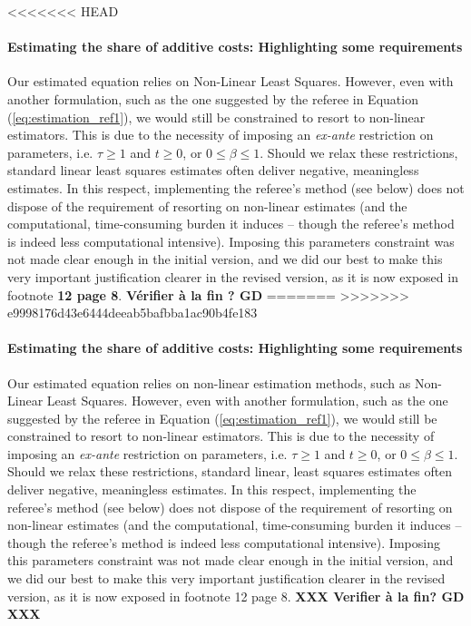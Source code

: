 \documentclass[a4paper,11pt]{article}
\begin{document}
<<<<<<< HEAD
\paragraph{Estimating the share of additive costs: Highlighting some requirements} Our estimated equation relies on Non-Linear Least Squares. However, even with another formulation, such as the one suggested by the referee in Equation (\ref{eq:estimation_ref1}), we would still be constrained to resort to non-linear estimators. This is due to the necessity of imposing an \textit{ex-ante} restriction on parameters, i.e. $\tau \geq 1$ and $t \geq 0$, or $0 \leq  \beta \leq 1$. Should we relax these restrictions, standard linear least squares estimates often deliver negative, meaningless estimates. In this respect, implementing the referee's method (see below) does not dispose of the requirement of resorting on non-linear estimates (and the computational, time-consuming burden it induces -- though the referee's method is indeed less computational intensive). Imposing this parameters constraint was not made clear enough in the initial version, and we did our best to make this very important justification clearer in the revised version, as it is now exposed in footnote \textbf{12 page 8}. \textbf{Vérifier à la fin ? GD}\smallskip
=======
>>>>>>> e9998176d43e6444deeab5bafbba1ac90b4fe183

\paragraph{Estimating the share of additive costs: Highlighting some requirements} Our estimated equation relies on non-linear estimation methods, such as Non-Linear Least Squares. However, even with another formulation, such as the one suggested by the referee in Equation (\ref{eq:estimation_ref1}), we would still be constrained to resort to non-linear estimators. This is due to the necessity of imposing an \textit{ex-ante} restriction on parameters, i.e. $\tau \geq 1$ and $t \geq 0$, or $0 \leq  \beta \leq 1$. Should we relax these restrictions, standard linear, least squares estimates often deliver negative, meaningless estimates. In this respect, implementing the referee's method (see below) does not dispose of the requirement of resorting on non-linear estimates (and the computational, time-consuming burden it induces -- though the referee’s method is indeed less computational intensive). Imposing this parameters constraint was not made clear enough in the initial version, and we did our best to make this very important justification clearer in the revised version, as it is now exposed in footnote 12 page 8. \textbf{XXX Verifier à la fin? GD XXX }\smallskip
\end{document}
